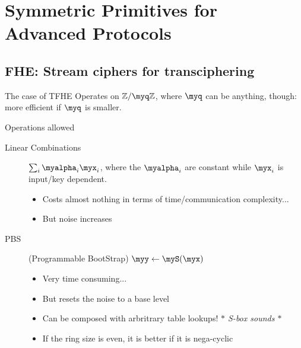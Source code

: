 \documentclass[presentation,aspectratio=1610]{beamer}
\begin{document}
\section{Symmetric Primitives for Advanced Protocols}

\subsection{FHE: Stream ciphers for transciphering}

\begin{frame}{The case of TFHE}
  Operates on $\Zmod{\myq}$, where $\myq$ can be anything, though:
  more efficient if $\myq$ is smaller.
  
  \begin{exampleblock}{Operations allowed}
    \begin{description}
    \item[Linear Combinations] $\sum_i \myalpha_i \myx_i$, where the $\myalpha_i$ are constant while $\myx_i$ is input/key dependent.

      \begin{itemize}
      \item Costs almost nothing in terms of time/communication complexity...
      \item But \alert{noise} increases
      \end{itemize}
      \pause
    \item[PBS] (\alert{P}rogrammable \alert{B}oot\alert{S}trap) \hspace{0.5cm} $\myy \gets \myS(\myx)$
      \begin{itemize}
      \item Very time consuming...
      \item But resets the noise to a \alert{base level} \pause
      \item Can be composed with \alert{arbritrary table lookups!} \pause \hfill {\emph{\color{gray}$*$ S-box sounds $*$}}
      \item If the ring size is even, it is better if it is \alert{nega-cyclic}
      \end{itemize}
    \end{description}
  \end{exampleblock}
\end{frame}
\end{document}
